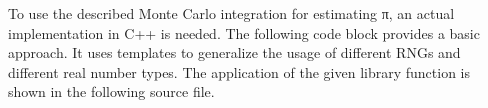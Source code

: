 \documentclass{stdlocal}
\begin{document}
    To use the described Monte Carlo integration for estimating π, an actual implementation in C++ is needed.
    The following code block provides a basic approach.
    It uses templates to generalize the usage of different RNGs and different real number types.
    The application of the given library function is shown in the following source file.

\end{document}
